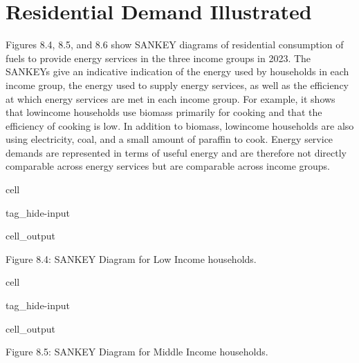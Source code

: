 \documentclass[letterpaper,10pt,english]{jupyterBook}
\begin{document}
\section{Residential Demand Illustrated}
\label{\detokenize{08Residential:residential-demand-illustrated}}
\sphinxAtStartPar
Figures 8.4, 8.5, and 8.6 show SANKEY diagrams of residential consumption of fuels to provide energy services in the three income groups in 2023. The SANKEYs give an indicative indication of the energy used by households in each income group, the energy used to supply energy services, as well as the efficiency at which energy services are met in each income group. For example, it shows that low\sphinxhyphen{}income households use biomass primarily for cooking and that the efficiency of cooking is low. In addition to biomass, low\sphinxhyphen{}income households are also using electricity, coal, and a small amount of paraffin to cook. Energy service demands are represented in terms of useful energy and are therefore not directly comparable across energy services but are comparable across income groups.

\begin{sphinxuseclass}{cell}
\begin{sphinxuseclass}{tag_hide-input}\begin{sphinxVerbatimOutput}

\begin{sphinxuseclass}{cell_output}
\noindent{}

\end{sphinxuseclass}\end{sphinxVerbatimOutput}

\end{sphinxuseclass}
\end{sphinxuseclass}
\sphinxAtStartPar
Figure 8.4: SANKEY Diagram for Low Income households.

\begin{sphinxuseclass}{cell}
\begin{sphinxuseclass}{tag_hide-input}\begin{sphinxVerbatimOutput}

\begin{sphinxuseclass}{cell_output}
\noindent{}

\end{sphinxuseclass}\end{sphinxVerbatimOutput}

\end{sphinxuseclass}
\end{sphinxuseclass}
\sphinxAtStartPar
Figure 8.5: SANKEY Diagram for Middle Income households.
\end{document}

